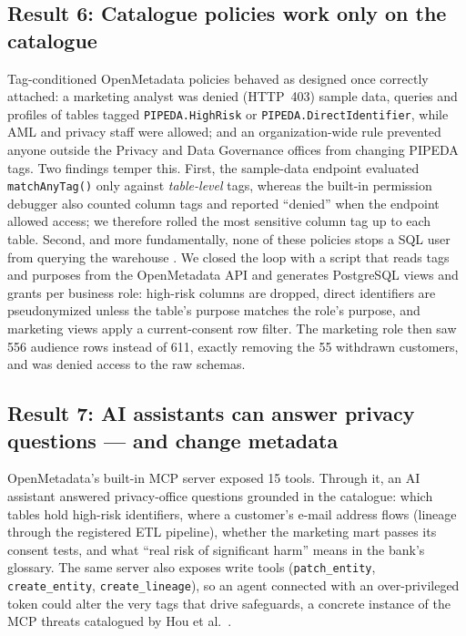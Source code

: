 \documentclass[journal,onecolumn,11pt]{IEEEtran}
\begin{document}
\subsection{Result 6: Catalogue policies work only on the catalogue}
Tag-conditioned OpenMetadata policies behaved as designed once correctly attached: a marketing analyst was denied (HTTP~403) sample data, queries and profiles of tables tagged \texttt{PIPEDA.HighRisk} or \texttt{PIPEDA.DirectIdentifier}, while AML and privacy staff were allowed; and an organization-wide rule prevented anyone outside the Privacy and Data Governance offices from changing PIPEDA tags. Two findings temper this. First, the sample-data endpoint evaluated \texttt{matchAnyTag()} only against \emph{table-level} tags, whereas the built-in permission debugger also counted column tags and reported ``denied'' when the endpoint allowed access; we therefore rolled the most sensitive column tag up to each table. Second, and more fundamentally, none of these policies stops a SQL user from querying the warehouse \cite{om_contracts}. We closed the loop with a script that reads tags and purposes from the OpenMetadata API and generates PostgreSQL views and grants per business role: high-risk columns are dropped, direct identifiers are pseudonymized unless the table's purpose matches the role's purpose, and marketing views apply a current-consent row filter. The marketing role then saw 556 audience rows instead of 611, exactly removing the 55 withdrawn customers, and was denied access to the raw schemas.

\subsection{Result 7: AI assistants can answer privacy questions --- and change metadata}
OpenMetadata's built-in MCP server exposed 15 tools. Through it, an AI assistant answered privacy-office questions grounded in the catalogue: which tables hold high-risk identifiers, where a customer's e-mail address flows (lineage through the registered ETL pipeline), whether the marketing mart passes its consent tests, and what ``real risk of significant harm'' means in the bank's glossary. The same server also exposes write tools (\texttt{patch\_entity}, \texttt{create\_entity}, \texttt{create\_lineage}), so an agent connected with an over-privileged token could alter the very tags that drive safeguards, a concrete instance of the MCP threats catalogued by Hou et al.\ \cite{hou_mcp}.

\end{document}
